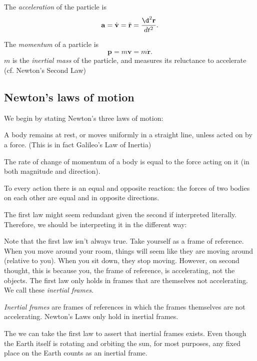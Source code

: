 \documentclass[a4paper]{article}
\begin{document}
\begin{defi}[Acceleration]
  The \emph{acceleration} of the particle is
  \[
    \mathbf{a} = \dot{\mathbf{v}} = \ddot{\mathbf{r}} = \frac{\d^2 \mathbf{r}}{d t^2}.
  \]
\end{defi}

\begin{defi}[Momentum]
  The \emph{momentum} of a particle is
  \[
    \mathbf{p} = m\mathbf{v} = m\dot{\mathbf{r}}.
  \]
  $m$ is the \emph{inertial mass} of the particle, and measures its reluctance to accelerate (cf. Newton's Second Law)
\end{defi}

\subsection{Newton's laws of motion}
We begin by stating Newton's three laws of motion:
\begin{law}
  A body remains at rest, or moves uniformly in a straight line, unless acted on by a force. (This is in fact Galileo's Law of Inertia)
\end{law}

\begin{law}
   The rate of change of momentum of a body is equal to the force acting on it (in both magnitude and direction).
\end{law}

\begin{law}
  To every action there is an equal and opposite reaction: the forces of two bodies on each other are equal and in opposite directions.
\end{law}
The first law might seem redundant given the second if interpreted literally. Therefore, we should be interpreting it in the different way:

Note that the first law isn't always true. Take yourself as a frame of reference. When you move around your room, things will seem like they are moving around (relative to you). When you sit down, they stop moving. However, on second thought, this is because you, the frame of reference, is accelerating, not the objects. The first law only holds in frames that are themselves not accelerating. We call these \emph{inertial frames}.
\begin{defi}
  \emph{Inertial frames} are frames of references in which the frames themselves are not accelerating. Newton's Laws only hold in inertial frames.
\end{defi}
The we can take the first law to assert that inertial frames exists. Even though the Earth itself is rotating and orbiting the sun, for most purposes, any fixed place on the Earth counts as an inertial frame.
\end{document}
